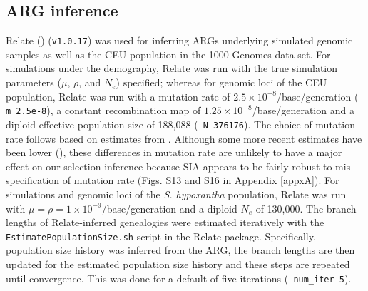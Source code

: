\subsection{\ac{ARG} inference}
Relate (\cite{speidel_method_2019}) (\texttt{v1.0.17}) was used for inferring \acp{ARG} underlying simulated genomic samples as well as the CEU population in the 1000 Genomes data set. For simulations under the \cite{tennessen_evolution_2012} demography, Relate was run with the true simulation parameters ($\mu$, $\rho$, and $N_e$) specified; whereas for genomic loci of the CEU population, Relate was run with a mutation rate of $2.5 \times 10^{-8}$/base/generation (\texttt{-m 2.5e-8}), a constant recombination map of $1.25 \times 10^{-8}$/base/generation and a diploid effective population size of 188,088 (\texttt{-N 376176}). The choice of mutation rate follows \cite{stern_approximate_2019} based on estimates from \cite{nachman_estimate_2000}. Although some more recent estimates have been lower (\cite{scally_revising_2012}), these differences in mutation rate are unlikely to have a major effect on our selection inference because \ac{SIA} appears to be fairly robust to mis-specification of mutation rate (Figs. \href{https://academic.oup.com/mbe/article/39/1/msab332/6433161?login=true#supplementary-data}{S13 and S16} in Appendix \ref{appxA}). For simulations and genomic loci of the \textit{S. hypoxantha} population, Relate was run with $\mu = \rho = 1 \times 10^{-9}$/base/generation and a diploid $N_e$ of 130,000. The branch lengths of Relate-inferred genealogies were estimated iteratively with the \texttt{EstimatePopulationSize.sh} script in the Relate package. Specifically, population size history was inferred from the \ac{ARG}, the branch lengths are then updated for the estimated population size history and these steps are repeated until convergence. This was done for a default of five iterations (\texttt{-num\_iter 5}).

